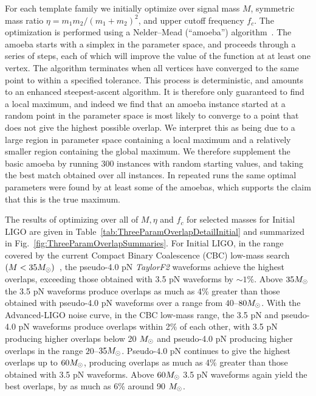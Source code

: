 For each template family we initially optimize over signal mass $M$,
symmetric mass ratio $\eta = m_1 m_2 / (m_1 + m_2)^2$, and upper
cutoff frequency $f_c$.  The optimization is performed using a
Nelder--Mead (``amoeba'') algorithm~\cite{numrec_cpp}.  The amoeba
starts with a simplex in the parameter space, and proceeds through a
series of steps, each of which will improve the value of the function
at at least one vertex.  The algorithm terminates when all vertices
have converged to the same point to within a specified tolerance.
This process is deterministic, and amounts to an enhanced
steepest-ascent algorithm.  It is therefore only guaranteed to find a
local maximum, and indeed we find that an amoeba instance started at a
random point in the parameter space is most likely to converge to a
point that does not give the highest possible overlap.  We interpret
this as being due to a large region in parameter space containing a
local maximum and a relatively smaller region containing the global
maximum.  We therefore supplement the basic amoeba by running 300
instances with random starting values, and taking the best match
obtained over all instances.  In repeated runs the same optimal
parameters were found by at least some of the amoebas, which supports
the claim that this is the true maximum.

The results of optimizing over all of $M, \eta$ and $f_c$ for selected
masses for Initial LIGO are given in
Table~\ref{tab:ThreeParamOverlapDetailInitial} and summarized in
Fig.~\ref{fig:ThreeParamOverlapSummaries}.  For Initial LIGO, in the
range covered by the current Compact Binary Coalescence (CBC) low-mass
search $(M < 35 M_{\odot})$~\cite{Abbott:2008}, the pseudo-4.0 pN
\textit{TaylorF2} waveforms achieve the highest overlaps, exceeding
those obtained with 3.5 pN waveforms by $\sim 1\%$.  Above $35 M_{\odot}$
the 3.5 pN waveforms produce overlaps as much as 4\% greater than
those obtained with pseudo-4.0 pN waveforms over a range from
$40$--$80 M_{\odot}$. With the Advanced-LIGO noise curve, in the CBC
low-mass range, the 3.5 pN and pseudo-4.0 pN waveforms produce
overlaps within 2\% of each other, with 3.5 pN producing higher
overlaps below 20 $M_{\odot}$ and pseudo-4.0 pN producing higher overlaps
in the range $20$--$35 M_{\odot}$.  Pseudo-4.0 pN continues to give the
highest overlaps up to $60 M_{\odot}$, producing overlaps as much as 4\%
greater than those obtained with 3.5 pN waveforms.  Above $60 M_{\odot}$
3.5 pN waveforms again yield the best overlaps, by as much as 6\%
around 90 $M_{\odot}$.


